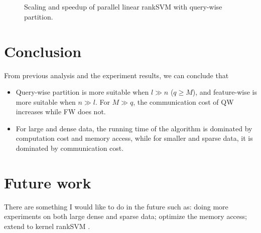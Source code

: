 \documentclass[11pt, oneside]{article}   	%
\begin{document}
	\begin{figure}
	\centering
	\\
	\\
	\caption{Scaling and speedup of parallel linear rankSVM with query-wise partition.}
	\end{figure}
\section{Conclusion}
From previous analysis and the experiment results, we can conclude that 
\begin{itemize}
\item Query-wise partition is more suitable when {$l \gg n$} ($q \ge M$), and feature-wise is more suitable when {$n \gg l$}. For $M \gg q$, the communication cost of QW increases while FW does not.
\item For large and dense data, the running time of the algorithm is dominated by computation cost and memory access, while for smaller and sparse data, it is dominated by communication cost.
\end{itemize}
\section{Future work}
There are something I would like to do in the future such as: doing more experiments on both large dense and sparse data; optimize the memory access; extend to kernel rankSVM \citep{TMK14a}.
\clearpage
 

\end{document}
